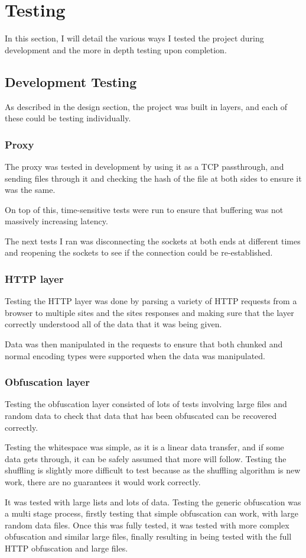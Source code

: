 \def\listingsfont{\ttfamily}
\section{Testing}
In this section, I will detail the various ways I tested the project during development and the more in depth testing upon completion.
\subsection{Development Testing}
As described in the design section, the project was built in layers, and each of these could be testing individually.
\subsubsection{Proxy}
The proxy was tested in development by using it as a TCP passthrough, and sending files through it and checking the hash of the file at both sides to ensure it was the same.\par
On top of this, time-sensitive tests were run to ensure that buffering was not massively increasing latency.\par
The next tests I ran was disconnecting the sockets at both ends at different times and reopening the sockets to see if the connection could be re-established.\par
\subsubsection{HTTP layer}
Testing the HTTP layer was done by parsing a variety of HTTP requests from a browser to multiple sites and the sites responses and making sure that the layer correctly understood all of the data that it was being given.\par
Data was then manipulated in the requests to ensure that both chunked and normal encoding types were supported when the data was manipulated.
\subsubsection{Obfuscation layer}
Testing the obfuscation layer consisted of lots of tests involving large files and random data to check that data that has been obfuscated can be recovered correctly.\par
Testing the whitespace was simple, as it is a linear data transfer, and if some data gets through, it can be safely assumed that more will follow.
Testing the shuffling is slightly more difficult to test because as the shuffling algorithm is new work, there are no guarantees it would work correctly.\par It was tested with large lists and lots of data.
Testing the generic obfuscation was a multi stage process, firstly testing that simple obfuscation can work, with large random data files. Once this was fully tested, it was tested with more complex obfuscation and similar large files, finally resulting in being tested with the full HTTP obfuscation and large files.
